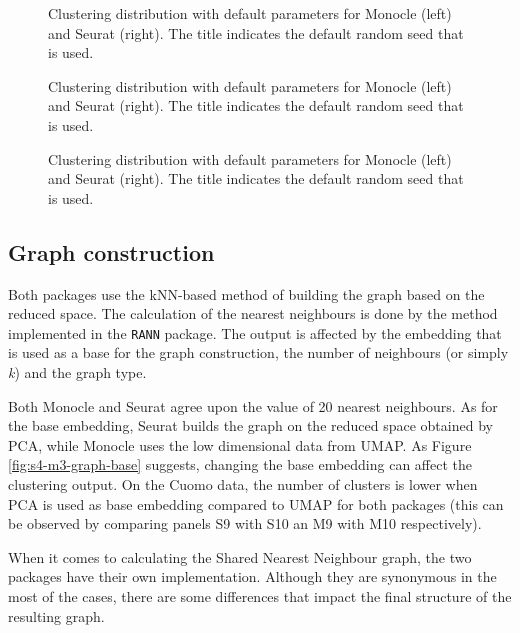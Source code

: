 \begin{landscape}
\begin{figure}[H]
    \centering
    \caption{\label{fig:s4-m3-pca}Clustering distribution with default parameters for Monocle (left) and Seurat (right). The title indicates the default random seed that is used.}
\end{figure}


\begin{figure}[H]
    \centering
    \caption{\label{fig:s4-m3-min-dist}Clustering distribution with default parameters for Monocle (left) and Seurat (right). The title indicates the default random seed that is used.}
\end{figure}

\begin{figure}[H]
    \centering
    \caption{\label{fig:s4-m3-n-neigh-umap}Clustering distribution with default parameters for Monocle (left) and Seurat (right). The title indicates the default random seed that is used.}
\end{figure}
\end{landscape}

\subsection{Graph construction}
Both packages use the kNN-based method of building the graph based on the reduced space. The calculation of the nearest neighbours is done by the method implemented in the \verb|RANN| package. The output is affected by the embedding that is used as a base for the graph construction, the number of neighbours (or simply \textit{k}) and the graph type.

Both Monocle and Seurat agree upon the value of 20 nearest neighbours. As for the base embedding, Seurat builds the graph on the reduced space obtained by PCA, while Monocle uses the low dimensional data from UMAP. As Figure \ref{fig:s4-m3-graph-base} suggests, changing the base embedding can affect the clustering output. On the Cuomo data, the number of clusters is lower when PCA is used as base embedding compared to UMAP for both packages (this can be observed by comparing panels S9 with S10 an M9 with M10 respectively).

When it comes to calculating the Shared Nearest Neighbour graph, the two packages have their own implementation. Although they are synonymous in the most of the cases, there are some differences that impact the final structure of the resulting graph.

